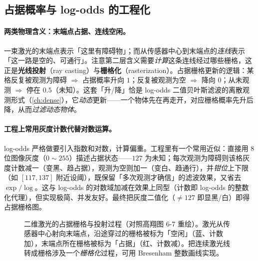 \subsection{占据概率与 log-odds 的工程化}
\label{sec:slam2d-logodds}

\paragraph{两类物理含义：末端点占据、连线空闲。}
一束激光的末端点表示「这里有障碍物」；而从传感器中心到末端点的\emph{连线}表示「这一路是空的、可通行」。注意第二层含义需要\emph{计算}这条连线经过哪些栅格，这正是\textbf{光线投射}（ray casting）与\textbf{栅格化}（rasterization）。占据栅格更新的逻辑：某格反复被观测为障碍 $\Rightarrow$ 占据概率升向 $1$；反复被观测为空 $\Rightarrow$ 降向 $0$；从未观测 $\Rightarrow$ 停在 $0.5$（未知）。这套「升/降」恰是 log-odds 二值贝叶斯滤波的离散观测形式（\cref{ch:dense}），它\emph{动态}更新——一个物体先在再走开，对应栅格概率先升后降，从而\emph{过滤动态物体}。

\paragraph{工程上常用灰度计数代替对数运算。}
log-odds 严格做要引入指数和对数，计算偏重。工程里有一个常用近似：直接用 $8$ 位图像灰度（$0\!\sim\!255$）描述占据状态——$127$ 为未知；每次观测为障碍则该格灰度计数减一（变黑、趋占据），观测为空则加一（变白、趋通行），并\emph{钳位}上下限（如 $[117,137]$ 附近设阈），既保留「多次观测才确信」的滤波效果，又省去 $\exp/\log$。这与 log-odds 的对数域加减在效果上同型（计数即 log-odds 的整数化代理），但实现极简、并发友好。最终把灰度二值化（$\ne 127$ 即显黑/白）即得占据栅格图。

\begin{figure}[H]
\centering
{}
\caption{二维激光的占据栅格与投射过程（对照高翔图 6-7 重绘）。激光从传感器中心射向末端点，沿途穿过的栅格被标为「空闲」（蓝、计数加），末端点所在栅格被标为「占据」（红、计数减）。把连续激光线转成栅格涉及一个\emph{栅格化}过程，可用 Bresenham 整数画线实现。}
\label{fig:slam2d-raycast}
\end{figure}

